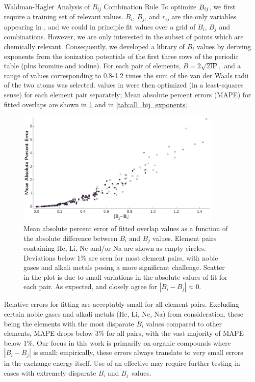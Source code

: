 \begin{section}{Waldman-Hagler Analysis of $B_{ij}$ Combination Rule}
To optimize $B_{ij}$, we first require a training set of
relevant \sijexact values. $B_i$, $B_j$, and $r_{ij}$ are the only
variables appearing in \sijexact, and we could in principle fit \B values over a
grid of $B_i$, $B_j$ and \R
combinations. However, we are only interested in the subset of 
points which are chemically relevant.
Consequently, we developed a
library of $B_i$ values by deriving exponents from the ionization potentials of the first three rows of
the periodic table (plus bromine and iodine).
For each pair of elements, $B = 2\sqrt{2\text{IP}},$\cite{Yu2011} and a range of \R
values corresponding to 0.8-1.2 times the sum of the van der Waals radii of the two
atoms was selected. \B values in \sijapprox were
then optimized (in a least-squares sense) for each element pair separately;
Mean absolute percent errors (MAPE) for fitted overlaps are shown
in \ref{fig:bij_mape} and in \ref{tab:all_bij_exponents}.


    \begin{figure}[t]
    \includegraphics[width=0.9\textwidth]{isotropic/si/bij_mape.pdf}
    \caption{
        Mean absolute percent error of fitted overlap values as a function of the
        absolute difference between $B_i$ and $B_j$ values. Element pairs containing
        He, Li, Ne and/or Na are shown as empty circles.  Deviations below 1\% are
        seen for most element pairs, with noble gases and alkali metals posing a more
        significant challenge. Scatter in the plot is due to small variations in the
        absolute values of \R fit for each pair.  As expected, \sijexact and
        \sijapprox closely agree for $|B_i - B_j| \approx 0$. 
           		  }
    \label{fig:bij_mape}
    \end{figure}

Relative errors for fitting are acceptably small for all element pairs.
Excluding certain noble gases and alkali metals (He, Li, Ne,
Na) from consideration, these being the elements with the most disparate $B_i$
values compared to other elements, MAPE drops below 3\% for all pairs, with
the vast majority of MAPE below 1\%. Our focus in this work is primarily on
organic compounds where $|B_i - B_j|$ is small; empirically, these errors always translate to very small
errors in the exchange energy itself.  
Use of an effective \B may require further testing in cases with extremely
disparate $B_i$ and $B_j$ values.


\end{section}
